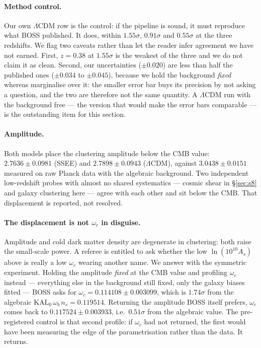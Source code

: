 \documentclass[12pt,a4paper]{article}
\newcommand{\SSEE}{\textsc{SSEE}}
\begin{document}
\paragraph{Method control.} Our own $\Lambda$CDM row is the control: if the
pipeline is sound, it must reproduce what BOSS published. It does, within
$1.55\sigma$, $0.91\sigma$ and $0.55\sigma$ at the three redshifts. We flag
two caveats rather than let the reader infer agreement we have not earned.
First, $z=0.38$ at $1.55\sigma$ is the weakest of the three and we do not
claim it as clean. Second, our uncertainties ($\pm0.020$) are less than half
the published ones ($\pm0.034$ to $\pm0.045$), because we hold the background
\emph{fixed} whereas \citet{Alam2017} marginalise over it: the smaller error
bar buys its precision by not asking a question, and the two are therefore
not the same quantity. A $\Lambda$CDM run with the background free --- the
version that would make the error bars comparable --- is the outstanding item
for this section.

\paragraph{Amplitude.} Both models place the clustering amplitude below the
CMB value: $2.7636\pm0.0981$ (\SSEE{}) and $2.7898\pm0.0943$
($\Lambda$CDM), against $3.0438\pm0.0151$ measured on raw Planck data with
the algebraic background. Two independent low-redshift probes with almost no
shared systematics --- cosmic shear in \S\ref{sec:s8} and galaxy clustering
here --- agree with each other and sit below the CMB. That displacement is
reported, not resolved.

\paragraph{The displacement is not $\omega_c$ in disguise.}
\label{par:wc-profile}
Amplitude and cold dark matter density are degenerate in clustering: both
raise the small-scale power. A referee is entitled to ask whether the low
$\ln(10^{10}A_s)$ above is really a low $\omega_c$ wearing another name. We
answer with the symmetric experiment. Holding the amplitude \emph{fixed} at
the CMB value and profiling $\omega_c$ instead --- everything else in the
background still fixed, only the galaxy biases fitted --- BOSS asks for
$\omega_c = 0.114108\pm0.003099$, which is $1.74\sigma$ from the algebraic
$\mathrm{KAL_0}\,\omega_b\,n_s = 0.119514$. Returning the amplitude BOSS
itself prefers, $\omega_c$ comes back to $0.117524\pm0.003933$, i.e.\
$0.51\sigma$ from the algebraic value. The pre-registered control is that
second profile: if $\omega_c$ had not returned, the first would have been
measuring the edge of the parametrisation rather than the data. It returns.
\end{document}
